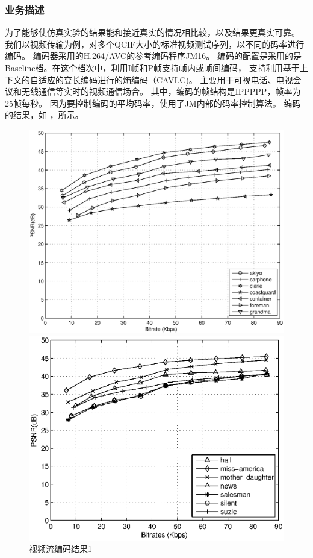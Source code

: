 \subsubsection{业务描述}
为了能够使仿真实验的结果能和接近真实的情况相比较，以及结果更真实可靠。
我们以视频传输为例，对多个QCIF大小的标准视频测试序列，以不同的码率进行编码。
编码器采用的H.264/AVC的参考编码程序JM16。
编码的配置是采用的是Baseline档。在这个档次中，利用I帧和P帧支持帧内或帧间编码，
支持利用基于上下文的自适应的变长编码进行的熵编码（CAVLC)。
主要用于可视电话、电视会议和无线通信等实时的视频通信场合\cite{BiHouJie2009}。
其中，编码的帧结构是IPPPPP，帧率为25帧每秒。
因为要控制编码的平均码率，使用了JM内部的码率控制算法。
编码的结果，如 ，所示。
\begin{figure}[tb] 
  \begin{minipage}[t]{0.5\linewidth} 
    \centering 
    \includegraphics[width = \textwidth]{chap_nash_videobitrate_psnr1.eps} 
    \caption{视频流编码结果1} 
    \label{fig:chap_nash:video_psnr1} 
  \end{minipage}%
  \begin{minipage}[t]{0.5\linewidth} 
    \centering 
    \includegraphics[width=\textwidth]{chap_nash_videobitrate_psnr2.eps} 

\end{minipage}
\end{figure}
